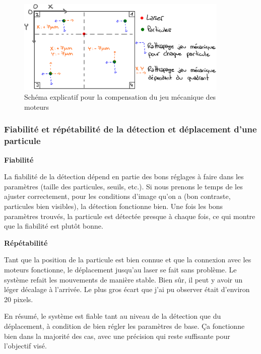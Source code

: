 \begin{figure}[H]
    \centering
    \includegraphics[width=0.9\textwidth]{assets/figures/Application_ServoVision/Schema_explicatif_jeu_mecanique.jpeg}
    \caption{Schéma explicatif pour la compensation du jeu mécanique des moteurs}
    \label{schema_explicatif_jeu}
\end{figure}

\subsubsection{Fiabilité et répétabilité de la détection et déplacement d'une particule}
\textbf{Fiabilité}

La fiabilité de la détection dépend en partie des bons réglages à faire dans les paramètres (taille des particules, seuils, etc.). Si nous prenons le temps de les ajuster correctement, pour les conditions d'image qu'on a (bon contraste, particules bien visibles), la détection fonctionne bien. Une fois les bons paramètres trouvés, la particule est détectée presque à chaque fois, ce qui montre que la fiabilité est plutôt bonne.

\textbf{Répétabilité}

Tant que la position de la particule est bien connue et que la connexion avec les moteurs fonctionne, le déplacement jusqu'au laser se fait sans problème. Le système refait les mouvements de manière stable. Bien sûr, il peut y avoir un léger décalage à l'arrivée. Le plus gros écart que j'ai pu observer était d'environ 20 pixels.

En résumé, le système est fiable tant au niveau de la détection que du déplacement, à condition de bien régler les paramètres de base. Ça fonctionne bien dans la majorité des cas, avec une précision qui reste suffisante pour l'objectif visé.